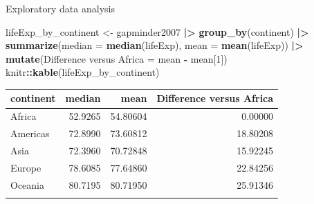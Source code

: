 \documentclass[
  ignorenonframetext,
]{beamer}
\newenvironment{Shaded}{\begin{snugshade}}{\end{snugshade}}
\newcommand{\AttributeTok}[1]{\textcolor[rgb]{0.13,0.29,0.53}{#1}}
\newcommand{\DecValTok}[1]{\textcolor[rgb]{0.00,0.00,0.81}{#1}}
\newcommand{\FunctionTok}[1]{\textcolor[rgb]{0.13,0.29,0.53}{\textbf{#1}}}
\newcommand{\NormalTok}[1]{#1}
\newcommand{\OtherTok}[1]{\textcolor[rgb]{0.56,0.35,0.01}{#1}}
\newcommand{\SpecialCharTok}[1]{\textcolor[rgb]{0.81,0.36,0.00}{\textbf{#1}}}
\newcommand{\StringTok}[1]{\textcolor[rgb]{0.31,0.60,0.02}{#1}}
\begin{document}
\begin{frame}[fragile]{Exploratory data analysis}
\label{exploratory-data-analysis-7}
\normalsize

\begin{Shaded}
\begin{Highlighting}[]
\NormalTok{lifeExp\_by\_continent }\OtherTok{\textless{}{-}}\NormalTok{ gapminder2007 }\SpecialCharTok{|\textgreater{}}
  \FunctionTok{group\_by}\NormalTok{(continent) }\SpecialCharTok{|\textgreater{}}
  \FunctionTok{summarize}\NormalTok{(}\AttributeTok{median =} \FunctionTok{median}\NormalTok{(lifeExp), }
            \AttributeTok{mean =} \FunctionTok{mean}\NormalTok{(lifeExp)) }\SpecialCharTok{|\textgreater{}} 
  \FunctionTok{mutate}\NormalTok{(}\StringTok{\textasciigrave{}}\AttributeTok{Difference versus Africa}\StringTok{\textasciigrave{}} \OtherTok{=}\NormalTok{ mean }\SpecialCharTok{{-}}\NormalTok{ mean[}\DecValTok{1}\NormalTok{])}
\NormalTok{knitr}\SpecialCharTok{::}\FunctionTok{kable}\NormalTok{(lifeExp\_by\_continent)}
\end{Highlighting}
\end{Shaded}

\begin{longtable}[]{@{}lrrr@{}}
\toprule\noalign{}
continent & median & mean & Difference versus Africa \\
\midrule\noalign{}
\endhead
Africa & 52.9265 & 54.80604 & 0.00000 \\
Americas & 72.8990 & 73.60812 & 18.80208 \\
Asia & 72.3960 & 70.72848 & 15.92245 \\
Europe & 78.6085 & 77.64860 & 22.84256 \\
Oceania & 80.7195 & 80.71950 & 25.91346 \\
\bottomrule\noalign{}
\end{longtable}

\normalsize
\end{frame}
\end{document}
